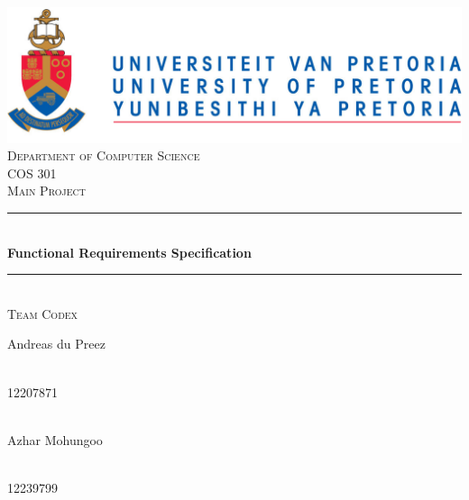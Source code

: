 \begin{titlepage}
	
	\begin{center}
		\includegraphics[width=1\textwidth]{../Images/University_of_Pretoria_Logo.PNG}\\[0.5cm]    
		\textsc{\LARGE Department of Computer Science}\\[0.5cm]
		\textsc{\Large COS 301}\\[0.5cm]
		\textsc{\Large Main Project} \nocite{ref}\\[0.75cm]
		\rule{\linewidth}{0.5mm} \\[0.4cm]
		{ \huge \bfseries Functional Requirements Specification}\\[0.5cm]
		\rule{\linewidth}{0.5mm} \\[1cm]
		
		\textsc{\Large Team Codex}\\[1cm]		
		
		
		\begin{minipage}{0.4\textwidth}
			\begin{flushleft} \large
				Andreas {du Preez}
			\end{flushleft}
		\end{minipage}
		\begin{minipage}{0.4\textwidth}
			\begin{flushright} \large
				\emph{} \\
				12207871 
			\end{flushright}
		\end{minipage}
		
		
		\begin{minipage}{0.4\textwidth}
			\begin{flushleft} \large
				\emph{} \\
				Azhar {Mohungoo }
			\end{flushleft}
		\end{minipage}
		\begin{minipage}{0.4\textwidth}
			\begin{flushright} \large
				\emph{} \\
				12239799
			\end{flushright}
		\end{minipage}
		

\end{center}
\end{titlepage}
